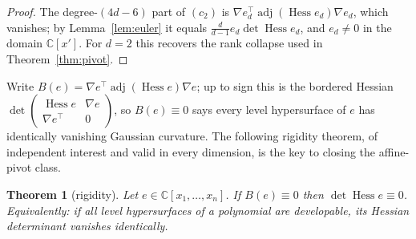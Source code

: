 \documentclass[11pt]{article}
\theoremstyle{plain}
\newtheorem{theorem}{Theorem}[section]
\theoremstyle{definition}
\newcommand{\C}{\mathbb{C}}
\newcommand{\Hess}{\operatorname{Hess}}
\newcommand{\adj}{\operatorname{adj}}
\begin{document}
\begin{proof}
The degree-$(4d-6)$ part of $(c_2)$ is
$\nabla e_d^\top\adj(\Hess e_d)\nabla e_d$, which vanishes; by
Lemma~\ref{lem:euler} it equals $\tfrac{d}{d-1}e_d\det\Hess e_d$, and
$e_d\ne0$ in the domain $\C[x']$. For $d=2$ this recovers the rank
collapse used in Theorem~\ref{thm:pivot}.
\end{proof}

Write $B(e)=\nabla e^\top\adj(\Hess e)\nabla e$; up to sign this is the
bordered Hessian $\det\left(\begin{smallmatrix}\Hess e&\nabla e\\
\nabla e^\top&0\end{smallmatrix}\right)$, so $B(e)\equiv0$ says every level
hypersurface of $e$ has identically vanishing Gaussian curvature. The
following rigidity theorem, of independent interest and valid in every
dimension, is the key to closing the affine-pivot class.

\begin{theorem}[rigidity]\label{thm:G}
Let $e\in\C[x_1,\dots,x_n]$. If $B(e)\equiv0$ then $\det\Hess e\equiv0$.
Equivalently: \emph{if all level hypersurfaces of a polynomial are
developable, its Hessian determinant vanishes identically.}
\end{theorem}
\end{document}
